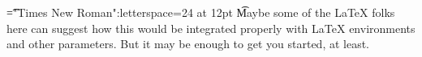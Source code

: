 \font\t="Times New Roman":letterspace=24 at 12pt
\t Maybe some of the LaTeX folks here can suggest how this would be integrated properly with LaTeX environments and other parameters. But it may be enough to get you started, at least. 


\bye
